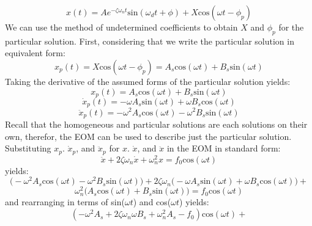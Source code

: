 \documentclass[12pt,letter]{article}
\numberwithin{ex}{section} %
\numberwithin{re}{section} %
\numberwithin{vcs}{section} %
\begin{document}
			\begin{equation}
				x(t) = Ae^{-\zeta \omega_n t}\text{sin}(\omega_d t + \phi) +  X \text{cos}(\omega t - \phi_p)
			\end{equation}			
			We can use the method of undetermined coefficients to obtain $X$ and $\phi_p$ for the particular solution. First, considering that we write the particular solution in equivalent form:
			\begin{equation}
				x_p(t) = X \text{cos}(\omega t - \phi_p) = A_s \text{cos}(\omega t) + B_s  \text{sin}(\omega t)
			\end{equation}			 
			Taking the derivative of the assumed forms of the particular solution yields:
			\begin{equation}
				x_p(t) = A_s \text{cos}(\omega t) + B_s  \text{sin}(\omega t)
			\end{equation}	
			\begin{equation}
				\dot{x}_p(t) = -\omega A_s \text{sin}(\omega t) + \omega B_s  \text{cos}(\omega t)
			\end{equation}				 
			\begin{equation}
				\ddot{x}_p(t) = -\omega^2 A_s \text{cos}(\omega t) - \omega^2 B_s  \text{sin}(\omega t)
			\end{equation}				
			Recall that the homogeneous and particular solutions are each solutions on their own, therefor, the EOM can be used to describe just the particular solution. Substituting $x_p$. $\dot{x}_p$, and $\ddot{x}_p$ for $x$. $\dot{x}$, and $\ddot{x}$ in the EOM in standard form:
			\begin{equation}
			 	\ddot{x}+2 \zeta \omega_n \dot{x} +\omega_n^2x = f_0\text{cos}(\omega t)
			\end{equation}
			yields:
			\begin{equation}
			 	\big(	-\omega^2 A_s \text{cos}(\omega t) - \omega^2 B_s  \text{sin}(\omega t) \big)+2 \zeta \omega_n  \big( -\omega A_s \text{sin}(\omega t) + \omega B_s  \text{cos}(\omega t)  \big) +
			\end{equation}
			\begin{equation*}
				\omega_n^2 \big( A_s \text{cos}(\omega t) + B_s  \text{sin}(\omega t) \big) = f_0\text{cos}(\omega t)
			\end{equation*}				
			and rearranging in terms of sin($\omega t$) and cos($\omega t$) yields: 
			\begin{equation}
				(-\omega^2 A_s + 2 \zeta \omega_n \omega B_s + \omega_n^2 A_s -f_0) \text{cos}(\omega t) + 
			\end{equation}
\end{document}
